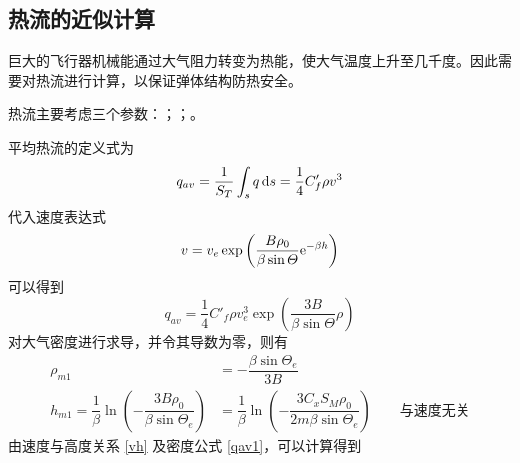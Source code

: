 

\subsection{热流的近似计算}

巨大的飞行器机械能通过大气阻力转变为热能，使大气温度上升至几千度。因此需要对热流进行计算，以保证弹体结构防热安全。

热流主要考虑三个参数：；；。
\vspace*{0.5em}

\sssection[平均热流$q_{av}$]

平均热流的定义式为
\begin{equation}
	q_{av} = \dfrac{1}{S_T}\int_s q\, {\rm{d}} s = \dfrac{1}{4} C'_f\rho v^3
\end{equation}
代入速度表达式
\begin{equation}
	v = v_e \exp\left(\dfrac{B \rho_0}{\beta \sin \varTheta} {\rm{e}}^{- \beta h}\right)
\end{equation}
可以得到
\begin{equation}
	q_{av} = \dfrac{1}{4}C'_f \rho v_e^3 \exp\left(\dfrac{3B}{\beta \sin \varTheta}\rho \right)
\end{equation}
对大气密度进行求导，并令其导数为零，则有
\begin{align}
	\rho_{m1} &= -\dfrac{\beta \sin \varTheta_e}{3 B} \label{qav1}\\[0.5em]
	h_{m1} = \dfrac{1}{\beta}\ln \left(- \dfrac{3B\rho_0}{\beta \sin \varTheta_e}\right) &= \dfrac{1}{\beta} \ln \left(- \dfrac{3C_x S_M \rho_0}{2 m \beta \sin \varTheta_e}\right) \qquad \mbox{与速度无关}
\end{align}
由速度与高度关系 \eqref{vh} 及密度公式 \eqref{qav1}，可以计算得到

